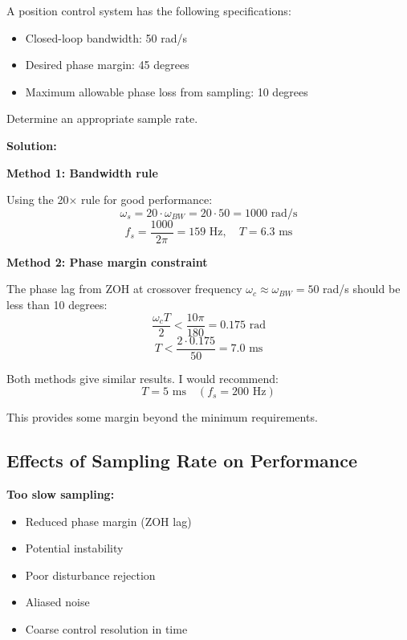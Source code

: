 \begin{example}
\label{ex:sample_rate}

A position control system has the following specifications:
\begin{itemize}
    \item Closed-loop bandwidth: 50 rad/s
    \item Desired phase margin: 45 degrees
    \item Maximum allowable phase loss from sampling: 10 degrees
\end{itemize}

Determine an appropriate sample rate.

\textbf{Solution:}

\textbf{Method 1: Bandwidth rule}

Using the 20$\times$ rule for good performance:
\begin{equation}
\omega_s = 20 \cdot \omega_{BW} = 20 \cdot 50 = 1000 \text{ rad/s}
\end{equation}
\begin{equation}
f_s = \frac{1000}{2\pi} = 159 \text{ Hz}, \quad T = 6.3 \text{ ms}
\end{equation}

\textbf{Method 2: Phase margin constraint}

The phase lag from ZOH at crossover frequency $\omega_c \approx \omega_{BW} = 50$ rad/s should be less than 10 degrees:
\begin{equation}
\frac{\omega_c T}{2} < \frac{10\pi}{180} = 0.175 \text{ rad}
\end{equation}
\begin{equation}
T < \frac{2 \cdot 0.175}{50} = 7.0 \text{ ms}
\end{equation}

Both methods give similar results. I would recommend:
\begin{equation}
\boxed{T = 5 \text{ ms} \quad (f_s = 200 \text{ Hz})}
\end{equation}

This provides some margin beyond the minimum requirements.
\end{example}

\subsection{Effects of Sampling Rate on Performance}

\textbf{Too slow sampling:}
\begin{itemize}
    \item Reduced phase margin (ZOH lag)
    \item Potential instability
    \item Poor disturbance rejection
    \item Aliased noise
    \item Coarse control resolution in time
\end{itemize}

